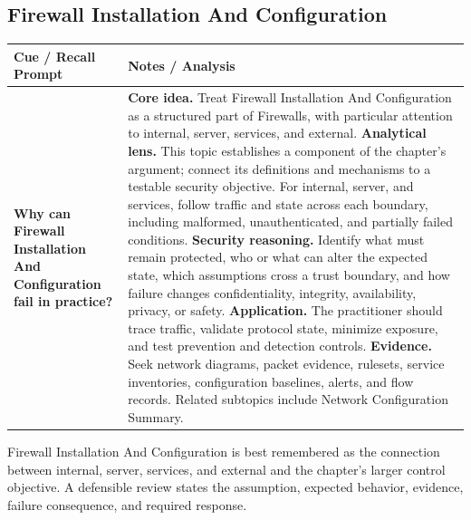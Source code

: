 \documentclass[11pt]{article}
\newcommand{\CornellHeader}{%
\rowcolor{Navy}\color{white}\bfseries Cue / Recall Prompt & \color{white}\bfseries Notes / Analysis\\\hline}
\newcommand{\CornellRow}[2]{%
\cellcolor{CueGray}\RaggedRight\textbf{#1} & \RaggedRight #2\\\hline}
\begin{document}
\subsection*{Firewall Installation And Configuration}
\begin{longtable}{>{\RaggedRight\arraybackslash}p{}|>{\RaggedRight\arraybackslash}p{}}
\CornellHeader
\CornellRow{Why can Firewall Installation And Configuration fail in practice?}{\textbf{Core idea.} Treat Firewall Installation And Configuration as a structured part of Firewalls, with particular attention to internal, server, services, and external. \textbf{Analytical lens.} This topic establishes a component of the chapter's argument; connect its definitions and mechanisms to a testable security objective. For internal, server, and services, follow traffic and state across each boundary, including malformed, unauthenticated, and partially failed conditions. \textbf{Security reasoning.} Identify what must remain protected, who or what can alter the expected state, which assumptions cross a trust boundary, and how failure changes confidentiality, integrity, availability, privacy, or safety. \textbf{Application.} The practitioner should trace traffic, validate protocol state, minimize exposure, and test prevention and detection controls. \textbf{Evidence.} Seek network diagrams, packet evidence, rulesets, service inventories, configuration baselines, alerts, and flow records. Related subtopics include Network Configuration Summary.}
\end{longtable}
\begin{topicsummary}
Firewall Installation And Configuration is best remembered as the connection between internal, server, services, and external and the chapter's larger control objective. A defensible review states the assumption, expected behavior, evidence, failure consequence, and required response.
\end{topicsummary}
\end{document}
